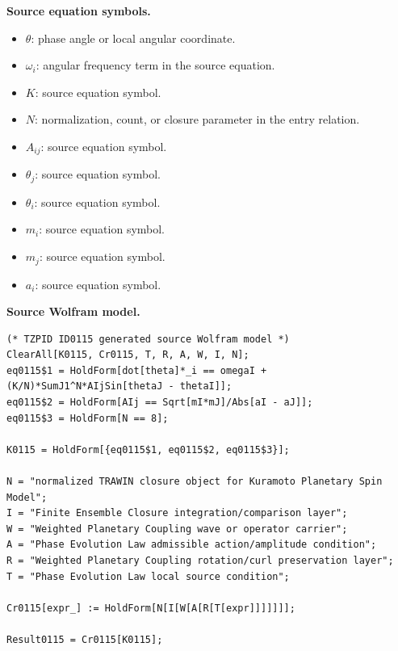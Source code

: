 \begin{minipage}[t]{0.49\linewidth}
\begingroup
\small
\raggedright
\textbf{Source equation symbols.}\par
\begin{itemize}[leftmargin=1.35em,itemsep=1pt,topsep=1pt,parsep=0pt]
    \item $\theta$: phase angle or local angular coordinate.
    \item $\omega_i$: angular frequency term in the source equation.
    \item $K$: source equation symbol.
    \item $N$: normalization, count, or closure parameter in the entry relation.
    \item $A_{ij}$: source equation symbol.
    \item $\theta_j$: source equation symbol.
    \item $\theta_i$: source equation symbol.
    \item $m_i$: source equation symbol.
    \item $m_j$: source equation symbol.
    \item $a_i$: source equation symbol.
\end{itemize}
\endgroup
\end{minipage}\hfill
\begin{minipage}[t]{0.47\linewidth}
\begingroup
\scriptsize
\raggedright
\textbf{Source Wolfram model.}\par
\begin{Verbatim}[fontsize=\tiny,breaklines=true,breakanywhere=true]
(* TZPID ID0115 generated source Wolfram model *)
ClearAll[K0115, Cr0115, T, R, A, W, I, N];
eq0115$1 = HoldForm[dot[theta]*_i == omegaI + (K/N)*SumJ1^N*AIjSin[thetaJ - thetaI]];
eq0115$2 = HoldForm[AIj == Sqrt[mI*mJ]/Abs[aI - aJ]];
eq0115$3 = HoldForm[N == 8];

K0115 = HoldForm[{eq0115$1, eq0115$2, eq0115$3}];

N = "normalized TRAWIN closure object for Kuramoto Planetary Spin Model";
I = "Finite Ensemble Closure integration/comparison layer";
W = "Weighted Planetary Coupling wave or operator carrier";
A = "Phase Evolution Law admissible action/amplitude condition";
R = "Weighted Planetary Coupling rotation/curl preservation layer";
T = "Phase Evolution Law local source condition";

Cr0115[expr_] := HoldForm[N[I[W[A[R[T[expr]]]]]]];

Result0115 = Cr0115[K0115];
\end{Verbatim}
\endgroup
\end{minipage}

